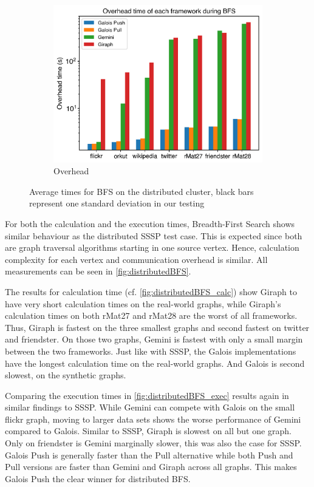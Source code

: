 \begin{figure}
\begin{subfigure}{0.32\textwidth}
		\includegraphics[width=\linewidth]{../../plots/distributedBFS_overheadTime.png}
		\caption{Overhead}
		\label{fig:distributedBFS_overhead}
	\end{subfigure}
	\hfil
	\caption{Average times for BFS on the distributed cluster, black bars represent one standard deviation in our testing}
	\label{fig:distributedBFS}
\end{figure}
For both the calculation and the execution times, Breadth-First Search shows similar behaviour as the distributed SSSP test case. This is expected since both are graph traversal algorithms starting in one source vertex.
Hence, calculation complexity for each vertex and communication overhead is similar. All measurements can be seen in \autoref{fig:distributedBFS}.

The results for calculation time (cf. \autoref{fig:distributedBFS_calc}) show Giraph to have very short calculation times on the real-world graphs, while Giraph's calculation times on both rMat27 and rMat28 are the worst of all frameworks. Thus, Giraph is fastest on the three smallest graphs and second fastest on twitter and friendster. On those two graphs, Gemini is fastest with only a small margin between the two frameworks.
Just like with SSSP, the Galois implementations have the longest calculation time on the real-world graphs. And Galois is second slowest, on the synthetic graphs.

Comparing the execution times in \autoref{fig:distributedBFS_exec} results again in similar findings to SSSP.
While Gemini can compete with Galois on the small flickr graph, moving to larger data sets shows the worse performance of Gemini compared to Galois.
Similar to SSSP, Giraph is slowest on all but one graph. Only on friendster is Gemini marginally slower, this was also the case for SSSP.
Galois Push is generally faster than the Pull alternative while both Push and Pull versions are faster than Gemini and Giraph across all graphs.
This makes Galois Push the clear winner for distributed BFS.

